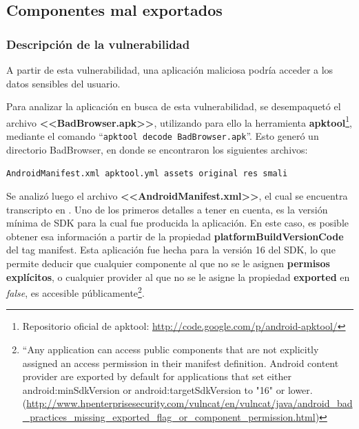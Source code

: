 \documentclass[11pt, a4paper, twoside]{article}
\begin{document}
\subsection{Componentes mal exportados}
\subsubsection{Descripción de la vulnerabilidad}
A partir de esta vulnerabilidad, una aplicación maliciosa podría 
acceder a los datos sensibles del usuario. 

Para analizar la aplicación en busca de esta vulnerabilidad, se desempaquetó el archivo \textbf{<<BadBrowser.apk>>}, utilizando para ello la herramienta \textbf{apktool}\footnote{Repositorio oficial de apktool: \url{http://code.google.com/p/android-apktool/}}, mediante el comando ``\texttt{apktool decode BadBrowser.apk}''. Esto generó un directorio BadBrowser, en donde se encontraron los siguientes archivos:
\begin{center}
\texttt{AndroidManifest.xml apktool.yml assets original res smali}
\end{center}

Se analizó luego el archivo \textbf{<<AndroidManifest.xml>>}, el cual se encuentra transcripto en . Uno de los primeros detalles a tener en cuenta, es la versión mínima de SDK para la cual fue producida la aplicación. En este caso, es posible obtener esa información a partir de la propiedad {\color{red}\textbf{platformBuildVersionCode}} del tag manifest. Esta aplicación fue hecha para la versión 16 del SDK, lo que permite deducir que cualquier componente al que no se le asignen \textbf{permisos explícitos}, o cualquier provider al que no se le asigne la propiedad \textbf{exported} en \emph{false}, es accesible públicamente\footnote{``Any application can access public components that are not explicitly assigned an access permission in their manifest definition. Android content provider are exported by default for applications that set either android:minSdkVersion or android:targetSdkVersion to "16" or lower. (\url{http://www.hpenterprisesecurity.com/vulncat/en/vulncat/java/android_bad_practices_missing_exported_flag_or_component_permission.html})}.
\end{document}
